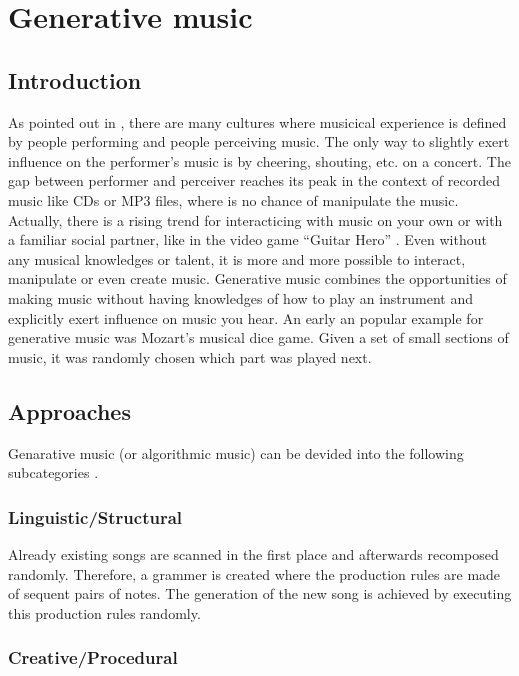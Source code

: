 	\section{Generative music}
	

	\subsection{Introduction}

	As pointed out in \cite{Chandra2012}, there are many cultures where musicical experience is defined by people performing and people perceiving music. 
	The only way to slightly exert influence on the performer's music is by cheering, shouting, etc. on a concert. 
	The gap between performer and perceiver reaches its peak in the context of recorded music like CDs or MP3 files, where is no chance of manipulate the music. 
	Actually, there is a rising trend for interacticing with music on your own or with a familiar social partner, like in the video game "`Guitar Hero"' \cite{Chandra2012, Planck2009}. 
	Even without any musical knowledges or talent, it is more and more possible to interact, manipulate or even create music.
	Generative music combines the opportunities of making music without having knowledges of how to play an instrument and explicitly exert influence on music you hear.
	An early an popular example for generative music was Mozart's musical dice game. Given a set of small sections of music, it was randomly chosen which part was played next.


	\subsection{Approaches} 

	Genarative music (or algorithmic music) can be devided into the following subcategories \cite{Wooller2005}.

	\subsubsection{Linguistic/Structural}

	Already existing songs are scanned in the first place and afterwards recomposed randomly. Therefore, a grammer is created where the production rules are made of sequent pairs of notes. The generation of the new song is achieved by executing this production rules randomly.

	\subsubsection{Creative/Procedural}

